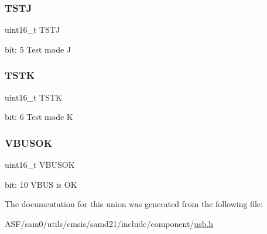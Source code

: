 \subsubsection{\texorpdfstring{TSTJ}{TSTJ}}
{\footnotesize\ttfamily uint16\+\_\+t T\+S\+TJ}

bit\+: 5 Test mode J \mbox{\label{union_u_s_b___h_o_s_t___c_t_r_l_b___type_a99db242eb0068c623d4fa3bff4698d3d}} 
\subsubsection{\texorpdfstring{TSTK}{TSTK}}
{\footnotesize\ttfamily uint16\+\_\+t T\+S\+TK}

bit\+: 6 Test mode K \mbox{\label{union_u_s_b___h_o_s_t___c_t_r_l_b___type_a7879561f4a609a31610f19055626bd1c}} 
\subsubsection{\texorpdfstring{VBUSOK}{VBUSOK}}
{\footnotesize\ttfamily uint16\+\_\+t V\+B\+U\+S\+OK}

bit\+: 10 V\+B\+US is OK 

The documentation for this union was generated from the following file\+:\begin{DoxyCompactItemize}
\item 
A\+S\+F/sam0/utils/cmsis/samd21/include/component/\mbox{\hyperlink{component_2usb_8h}{usb.\+h}}\end{DoxyCompactItemize}
